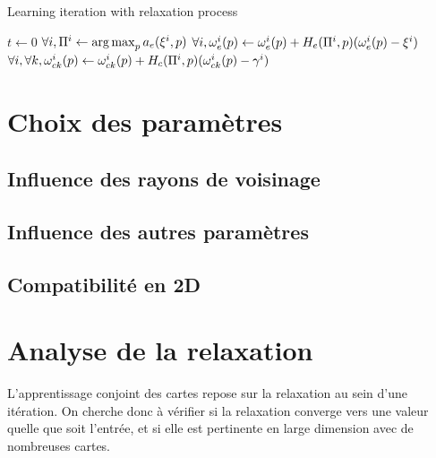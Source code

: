 \begin{algorithm}
  \DontPrintSemicolon 
  \caption{Learning iteration with relaxation process}\label{algo:cxsom}
   $t \leftarrow 0$ \;
   $\forall i , \Pi^{i} \leftarrow \operatorname*{arg\,max}_p a_{e}(\xi^{i},p)$\;
  $\forall i, \omega_{e}^{i}(p) \leftarrow \omega_{e}^{i}(p) + H_{e}(\Pi^{i}, p)(\omega_{e}^{i}(p) - \xi^{i})$\;
  $\forall i, \forall k, \omega_{ck}^{i}(p) \leftarrow \omega_{ck}^{i}(p) + H_{c}(\Pi^{i},p)(\omega_{ck}^{i}(p) - \gamma^{i})$
\end{algorithm}
 

\section{Choix des paramètres}

\subsection{Influence des rayons de voisinage}

\subsection{Influence des autres paramètres}

\subsection{Compatibilité en 2D}

\section{Analyse de la relaxation}

L'apprentissage conjoint des cartes repose sur la relaxation au sein d'une itération. On cherche donc à vérifier si la relaxation converge vers une valeur quelle que soit l'entrée, et si elle est pertinente en large dimension avec de nombreuses cartes.

